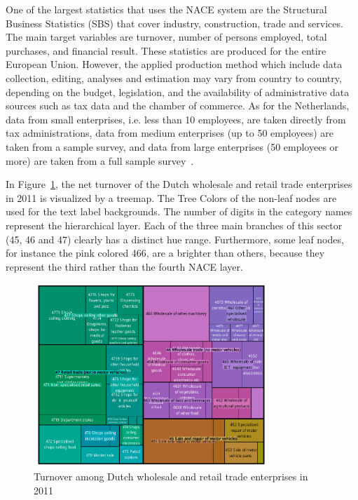 \documentclass[journal]{vgtc}                %
\begin{document}
One of the largest statistics that uses the NACE system are the Structural Business Statistics (SBS) that cover industry, construction, trade and services. The main target variables are turnover, number of persons employed, total purchases, and financial result. These statistics are produced for the entire European Union. However, the applied production method which include data collection, editing, analyses and estimation may vary from country to country, depending on the budget, legislation, and the availability of administrative data sources such as tax data and the chamber of commerce. As for the Netherlands, data from small enterprises, i.e. less than 10 employees, are taken directly from tax administrations, data from medium enterprises (up to 50 employees) are taken from a sample survey, and data from large enterprises (50 employees or more) are taken from a full sample survey~\cite{cbsSBS}.


In Figure~\ref{fig:treemapApp}, the net turnover of the Dutch wholesale and retail trade enterprises in 2011 is visualized by a treemap. The Tree Colors of the non-leaf nodes are used for the text label backgrounds. The number of digits in the category names represent the hierarchical layer. Each of the three main branches of this sector (45, 46 and 47) clearly has a distinct hue range. Furthermore, some leaf nodes, for instance the pink colored 466, are a brighter than others, because they represent the third rather than the fourth NACE layer.


\begin{figure}[tb]
  \centering
  \includegraphics[width=3.5in]{TMbusiness.pdf}
  \caption{Turnover among Dutch wholesale and retail trade enterprises in 2011}\label{fig:treemapApp}
\end{figure}
\end{document}
